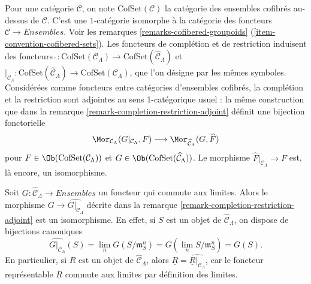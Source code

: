 \begin{remark}
\label{remark-completion-restriction-cofset-adjoint}
Pour une catégorie $\mathcal{C}$, on note $\text{CofSet}(\mathcal{C})$ la
catégorie des ensembles cofibrés au-dessus de $\mathcal{C}$. C'est une
$1$-catégorie isomorphe à la catégorie des foncteurs
$\mathcal{C} \to \textit{Ensembles}$. Voir les remarques
\ref{remarks-cofibered-groupoids}
(\ref{item-convention-cofibered-sets}).
Les foncteurs de complétion et de restriction induisent des foncteurs
$\widehat{~} : \text{CofSet}(\mathcal{C}_\Lambda) \to
\text{CofSet}(\widehat{\mathcal{C}}_\Lambda)$ et
$|_{\mathcal{C}_\Lambda} : \text{CofSet}(\widehat{\mathcal{C}}_\Lambda) \to
\text{CofSet}(\mathcal{C}_\Lambda)$, que l'on désigne par les mêmes symboles.
Considérées comme foncteurs entre catégories d'ensembles cofibrés, la
complétion et la restriction sont adjointes au sens 1-catégorique usuel :
la même construction que dans la remarque
\ref{remark-completion-restriction-adjoint} définit une bijection fonctorielle
$$
\Mor_{\mathcal{C}_\Lambda}(G|_{\mathcal{C}_\Lambda}, F)
\longrightarrow
\Mor_{\widehat{\mathcal{C}}_\Lambda}(G, \widehat{F})
$$
pour $F \in \Ob(\text{CofSet}(\mathcal{C}_\Lambda))$ et
$G \in \Ob(\text{CofSet}(\widehat{\mathcal{C}}_\Lambda))$.
Le morphisme $\widehat{F}|_{\mathcal{C}_\Lambda} \to F$ est, là encore, un
isomorphisme.
\end{remark}

\begin{remark}
\label{remark-restrict-complete-continuous-functor}
Soit $G : \widehat{\mathcal{C}}_\Lambda \to \textit{Ensembles}$ un foncteur qui
commute aux limites. Alors le morphisme
$G \to \widehat{G|_{\mathcal{C}_\Lambda}}$ décrite dans la remarque
\ref{remark-completion-restriction-adjoint} est un isomorphisme. En effet, si
$S$ est un objet de $\widehat{\mathcal{C}}_\Lambda$, on dispose de bijections
canoniques
$$
\widehat{G|_{\mathcal{C}_\Lambda}}(S) =
\lim_n G(S/\mathfrak{m}_S^n) =
G(\lim_n S/\mathfrak{m}_S^n) = G(S).
$$
En particulier, si $R$ est un objet de $\widehat{\mathcal{C}}_\Lambda$, alors
$\underline{R} = \widehat{\underline{R}|_{\mathcal{C}_\Lambda}}$, car le
foncteur représentable $\underline{R}$ commute aux limites par définition des
limites.
\end{remark}

